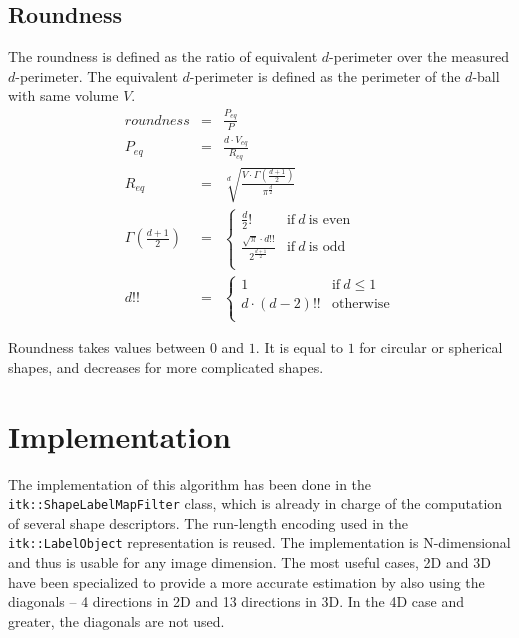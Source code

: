 \documentclass{InsightArticle}
\begin{document}
\subsection{Roundness}

The roundness is defined as the ratio of equivalent $d$-perimeter over the measured $d$-perimeter. 
The equivalent $d$-perimeter is defined as the perimeter of the $d$-ball with same volume $V$.
\begin{eqnarray}
roundness             & = & \frac{P_{eq}}{P} \\
P_{eq}                & = & \frac{d \cdot V_{eq}}{R_{eq}} \\
R_{eq}                & = & \sqrt[\displaystyle d]{\frac{V\cdot\Gamma(\frac{d+1}{2})}{\pi^\frac{d}{2}}} \\
\Gamma(\frac{d+1}{2}) & = & \begin{cases}
                               \displaystyle \frac{d}{2}!  &\text{if}~ d ~\text{is even} \\
                               \displaystyle \frac{\sqrt{\pi} \cdot d!!}{2^{\frac{d+1}{2}}}  &\text{if}~ d ~\text{is odd} \\
                            \end{cases} \\
d!!                   & = & \begin{cases}
                                1 &\text{if}~ d \leq 1 \\
                                d \cdot (d-2)!!  & \text{otherwise} \\
                             \end{cases}
\end{eqnarray}


Roundness takes values between $0$ and $1$. 
It is equal to $1$ for circular or spherical shapes, 
and decreases for more complicated shapes.


\section{Implementation}

The implementation of this algorithm has been done in the \verb$itk::ShapeLabelMapFilter$ class, which is already in charge of the computation of
several shape descriptors. The run-length encoding used in the \verb$itk::LabelObject$ representation is reused.
The implementation is N-dimensional and thus is usable for any image dimension. The most useful cases, 2D and 3D have been specialized
to provide a more accurate estimation by also using the diagonals -- 4 directions in 2D and 13 directions in 3D. In the 4D case and greater,
the diagonals are not used.
\end{document}
